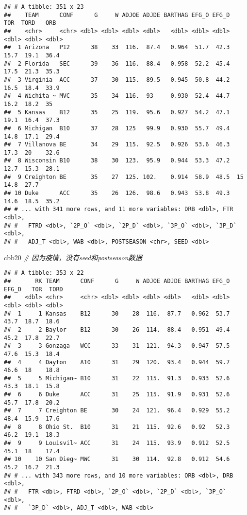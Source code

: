 \documentclass[
]{article}
\newenvironment{Shaded}{\begin{snugshade}}{\end{snugshade}}
\newcommand{\CommentTok}[1]{\textcolor[rgb]{0.56,0.35,0.01}{\textit{#1}}}
\newcommand{\NormalTok}[1]{#1}
\begin{document}
\begin{verbatim}
## # A tibble: 351 x 23
##    TEAM      CONF      G     W ADJOE ADJDE BARTHAG EFG_O EFG_D   TOR  TORD   ORB
##    <chr>     <chr> <dbl> <dbl> <dbl> <dbl>   <dbl> <dbl> <dbl> <dbl> <dbl> <dbl>
##  1 Arizona   P12      38    33  116.  87.4   0.964  51.7  42.3  15.7  19.1  36.4
##  2 Florida   SEC      39    36  116.  88.4   0.958  52.2  45.4  17.5  21.3  35.3
##  3 Virginia  ACC      37    30  115.  89.5   0.945  50.8  44.2  16.5  18.4  33.9
##  4 Wichita ~ MVC      35    34  116.  93     0.930  52.4  44.7  16.2  18.2  35  
##  5 Kansas    B12      35    25  119.  95.6   0.927  54.2  47.1  19.1  16.4  37.3
##  6 Michigan  B10      37    28  125   99.9   0.930  55.7  49.4  14.8  17.1  29.4
##  7 Villanova BE       34    29  115.  92.5   0.926  53.6  46.3  17.3  20    32.6
##  8 Wisconsin B10      38    30  123.  95.9   0.944  53.3  47.2  12.7  15.3  28.1
##  9 Creighton BE       35    27  125. 102.    0.914  58.9  48.5  15    14.8  27.7
## 10 Duke      ACC      35    26  126.  98.6   0.943  53.8  49.3  14.6  18.5  35.2
## # ... with 341 more rows, and 11 more variables: DRB <dbl>, FTR <dbl>,
## #   FTRD <dbl>, `2P_O` <dbl>, `2P_D` <dbl>, `3P_O` <dbl>, `3P_D` <dbl>,
## #   ADJ_T <dbl>, WAB <dbl>, POSTSEASON <chr>, SEED <dbl>
\end{verbatim}

\begin{Shaded}
\begin{Highlighting}[]
\NormalTok{cbb20 }\CommentTok{\# 因为疫情，没有seed和postseason数据}
\end{Highlighting}
\end{Shaded}

\begin{verbatim}
## # A tibble: 353 x 22
##       RK TEAM      CONF      G     W ADJOE ADJDE BARTHAG EFG_O EFG_D   TOR  TORD
##    <dbl> <chr>     <chr> <dbl> <dbl> <dbl> <dbl>   <dbl> <dbl> <dbl> <dbl> <dbl>
##  1     1 Kansas    B12      30    28  116.  87.7   0.962  53.7  43.7  18.7  18.6
##  2     2 Baylor    B12      30    26  114.  88.4   0.951  49.4  45.2  17.8  22.7
##  3     3 Gonzaga   WCC      33    31  121.  94.3   0.947  57.5  47.6  15.3  18.4
##  4     4 Dayton    A10      31    29  120.  93.4   0.944  59.7  46.6  18    18.8
##  5     5 Michigan~ B10      31    22  115.  91.3   0.933  52.6  43.3  18.1  15.8
##  6     6 Duke      ACC      31    25  115.  91.9   0.931  52.6  45.7  17.8  20.2
##  7     7 Creighton BE       30    24  121.  96.4   0.929  55.2  48.4  15.9  17.6
##  8     8 Ohio St.  B10      31    21  115.  92.6   0.92   52.3  46.2  19.1  18.3
##  9     9 Louisvil~ ACC      31    24  115.  93.9   0.912  52.5  45.1  18    17.4
## 10    10 San Dieg~ MWC      31    30  114.  92.8   0.912  54.6  45.2  16.2  21.3
## # ... with 343 more rows, and 10 more variables: ORB <dbl>, DRB <dbl>,
## #   FTR <dbl>, FTRD <dbl>, `2P_O` <dbl>, `2P_D` <dbl>, `3P_O` <dbl>,
## #   `3P_D` <dbl>, ADJ_T <dbl>, WAB <dbl>
\end{verbatim}
\end{document}
